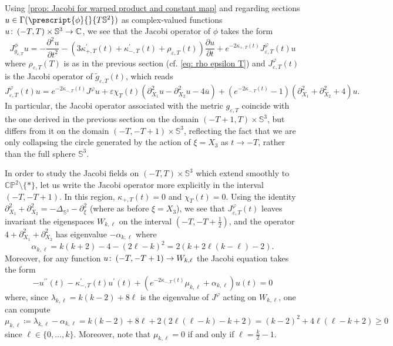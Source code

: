 \documentclass{article}
\numberwithin{equation}{section}        %
\theoremstyle{bfnote}
\theoremstyle{definition}
\theoremstyle{bfremark}
\newcommand{\col}{\colon \thinspace}        %
\newcommand{\C}{\mathbb{C}}                 %
\newcommand{\Sp}{\mathbb{S}}                %
\begin{document}
Using \cref{prop: Jacobi for warped product and constant map} and regarding sections $u \in \Gamma(\prescript{\phi}{}{T\Sp^2})$ as complex-valued functions $u \col (-T,T) \times \Sp^3 \rightarrow \C$, we see that the Jacobi operator of $\phi$ takes the form
\begin{equation}
    J^\phi_{g_{\varepsilon,T}} u = - \frac{\partial^2 u}{\partial t^2} - (3 \kappa^\prime_{+,T}(t) + \kappa^\prime_{-,T}(t) + \rho_{\varepsilon,T}(t)) \frac{\partial u}{\partial t} + e^{-2\kappa_{+,T}(t)} J^\varphi_{\varepsilon,T}(t) u
\end{equation}
where $\rho_{\varepsilon,T}(T)$ is as in the previous section (cf. \eqref{eq: rho epsilon T}) and $J^\varphi_{\varepsilon,T}(t)$ is the Jacobi operator of $\tilde{g}_{\varepsilon,T}(t)$, which reads
\begin{equation}
    J^\varphi_{\varepsilon,T}(t) u = e^{-2\kappa_{-,T}(t)} J^\varphi u + \varepsilon \chi_T(t) (\partial^2_{X_1}u - \partial^2_{X_2} u - 4 \overline{u}) + (e^{-2\kappa_{-,T}(t)} -1) (\partial_{X_1}^2 + \partial_{X_2}^2 + 4) u.
\end{equation}
In particular, the Jacobi operator associated with the metric $g_{\varepsilon,T}$ coincide with the one derived in the previous section on the domain $(-T+1,T) \times \Sp^3$, but differs from it on the domain $(-T,-T+1) \times \Sp^3$, reflecting the fact that we are only collapsing the circle generated by the action of $\xi = X_3$ as $t \to -T$, rather than the full sphere $\Sp^3$. 

In order to study the Jacobi fields on $(-T,T) \times \Sp^3$ which extend smoothly to $\mathbb{CP}^2 \setminus \{ *\}$, let us write the Jacobi operator more explicitly in the interval $(-T,-T+1)$. In this region, $\kappa_{+,T}(t) = 0$ and $\chi_T(t) = 0$. Using the identity $\partial_{X_1}^2 + \partial_{X_2}^2 = - \Delta_{\Sp^3} - \partial_\xi^2$ (where as before $\xi = X_3$), we see that $J^\varphi_{\varepsilon,T}(t)$ leaves invariant the eigenspaces $W_{k,\ell}$ on the interval $(-T,-T+\frac{1}{2})$, and the operator $4 + \partial_{X_1}^2 + \partial_{X_2}^2$ has eigenvalue $-\alpha_{k,\ell}$ where
\begin{equation*}
    \alpha_{k,\ell} = k(k+2) -4 - (2\ell-k)^2 = 2(k + 2\ell(k-\ell) - 2) .
\end{equation*}
Moreover, for any function $u \col (-T,-T+1) \to W_{k,\ell}$ the Jacobi equation takes the form
\begin{equation}       \label{eq: ODE with mukl 1}
    - u^{\prime\prime}(t) - \kappa_{-,T}^\prime(t) u^\prime(t) + \left(e^{-2\kappa_{-,T}(t)}\mu_{k,\ell} + \alpha_{k,\ell} \right) u(t) = 0 
\end{equation}
where, since $\lambda_{k,\ell} = k(k-2) + 8 \ell$ is the eigenvalue of $J^\varphi$ acting on $W_{k,\ell}$, one can compute
\begin{equation*}
    \mu_{k,\ell} \coloneqq \lambda_{k,\ell} - \alpha_{k,\ell} = k(k-2)+8\ell + 2(2\ell(\ell-k) - k + 2) = (k-2)^2 + 4\ell(\ell-k+2) \geq 0
\end{equation*}
since $\ell \in \{0,\ldots,k\}$. Moreover, note that $\mu_{k,\ell} = 0$ if and only if $\ell = \frac{k}{2}-1$. 
\end{document}
